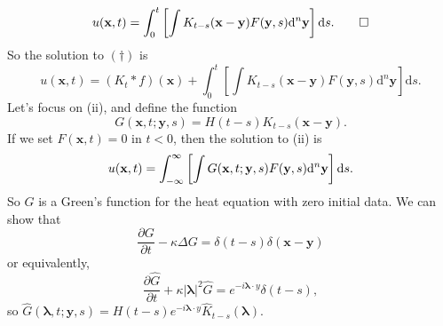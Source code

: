 \documentclass{article}
\begin{document}
\[
u(\mathbf x,t)=\int_0^t\left[\int K_{t-s}(\mathbf x-\mathbf y)F(\mathbf y,s)\mathrm d^n \mathbf y\right]\mathrm ds.\qed
\]
So the solution to $ (\dagger) $ is
\[
  u(\mathbf x,t)=(K_t*f)(\mathbf x)+\int_0^t\left[\int K_{t-s}(\mathbf x-\mathbf y)F(\mathbf y,s)\mathrm d^n \mathbf y\right]\mathrm ds.
\]
Let's focus on (ii), and define the function
\[
	G(\mathbf x,t;\mathbf y,s)=H(t-s)K_{t-s}(\mathbf x-\mathbf y).
\]
If we set $ F(\mathbf x,t)=0 $ in $ t<0 $, then the solution to (ii) is
\[
	u(\mathbf x,t)=\int_{-\infty}^\infty\left[\int G(\mathbf x,t;\mathbf y,s)F(\mathbf y,s)\mathrm d^n\mathbf y\right]\mathrm ds.
\]
So $ G $ is a Green's function for the heat equation with zero initial data. We can show that
\[
	\frac{\partial G}{\partial t}-\kappa\Delta G=\delta(t-s)\delta(\mathbf x-\mathbf y)
\]
or equivalently,
\[
	\frac{\partial \hat G}{\partial t}+\kappa |\boldsymbol\lambda|^2 \hat G= e^{-i\boldsymbol\lambda\cdot y}\delta(t-s),
\]
so $ \hat G(\boldsymbol\lambda,t;\mathbf y,s)=H(t-s)e^{-i\boldsymbol\lambda\cdot y}\hat K_{t-s}(\boldsymbol \lambda) $.
\end{document}

